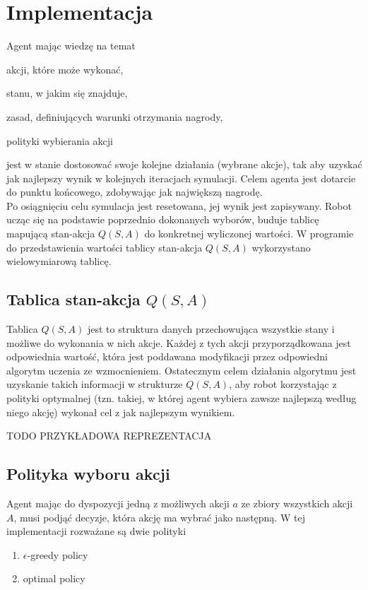 \chapter{Implementacja}
\label{cha:implementacja}

Agent mając wiedzę na temat
\begin{itemize*}
\renewcommand{\labelitemi}{$\bullet$}
 \item akcji, które może wykonać,
 \item stanu, w jakim się znajduje,
 \item zasad, definiujących warunki otrzymania nagrody,
 \item polityki wybierania akcji
\end{itemize*}
jest w stanie dostosować swoje kolejne działania (wybrane akcje), tak aby uzyskać jak
najlepszy wynik w kolejnych iteracjach symulacji. Celem agenta jest dotarcie do punktu końcowego, zdobywając jak 
największą nagrodę. \\
\indent Po osiągnięciu celu symulacja jest resetowana, jej wynik jest zapisywany. Robot ucząc się na podstawie 
poprzednio dokonanych wyborów, buduje tablicę mapującą stan-akcja $Q(S, A)$ do konkretnej wyliczonej wartości. W 
programie do przedstawienia wartości tablicy stan-akcja $Q(S, A)$ wykorzystano wielowymiarową tablicę.

\section{Tablica stan-akcja $Q(S, A)$}

Tablica $Q(S, A)$ jest to struktura danych przechowująca wszystkie stany i możliwe do wykonania w nich akcje. Każdej z tych akcji przyporządkowana jest odpowiednia wartość, która jest poddawana modyfikacji przez odpowiedni algorytm uczenia ze wzmocnieniem.
Ostatecznym celem działania algorytmu jest uzyskanie takich informacji w strukturze $Q(S, A)$, aby robot korzystając z polityki optymalnej (tzn. takiej, w której agent wybiera zawsze najlepszą według niego akcję) wykonał cel z jak najlepszym wynikiem.

TODO PRZYKŁADOWA REPREZENTACJA

\section{Polityka wyboru akcji}
\label{sec:politykawyboru}

Agent mając do dyspozycji jedną z możliwych akcji $a$ ze zbiory wszystkich akcji $A$, musi podjąć decyzje, która akcję ma wybrać jako następną. W tej implementacji rozważane są dwie polityki
\begin{enumerate}
	\item $\epsilon$-greedy policy
	\item optimal policy
\end{enumerate}

